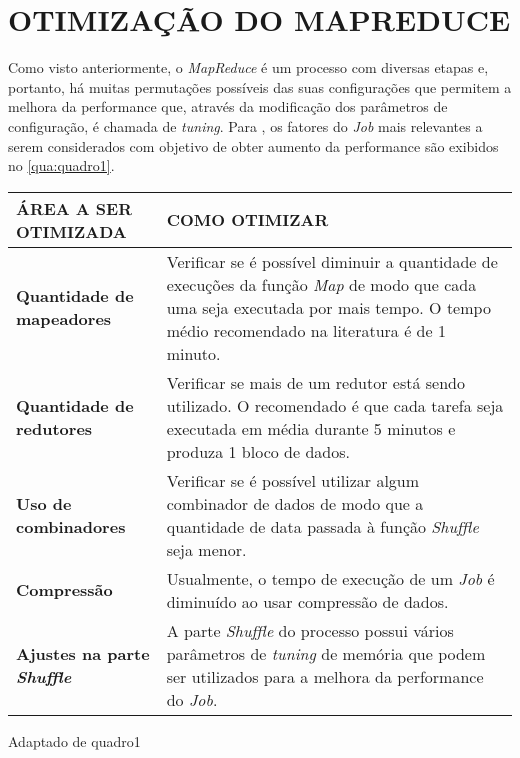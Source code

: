 \chapter{OTIMIZAÇÃO DO MAPREDUCE} \label{cha:otimizacaomapreduce}

Como visto anteriormente, o \textit{MapReduce} é um processo com diversas etapas e, portanto, há muitas permutações possíveis das suas configurações que permitem a melhora da performance que, através da modificação dos parâmetros de configuração, é chamada de \textit{tuning}. Para \textcite{HadoopBook15}, os fatores do \textit{Job} mais relevantes a serem considerados com objetivo de obter aumento da performance são exibidos no \autoref{qua:quadro1}.

{\footnotesize
  \centering
  \begin{tabular}{|p{50mm}|p{100mm}|}\hline
    \textbf{ÁREA A SER OTIMIZADA}              & \textbf{COMO OTIMIZAR}                                                                                                                                                                       \\\hline
    \textbf{Quantidade de mapeadores}          & Verificar se é possível diminuir a quantidade de execuções da função \textit{Map} de modo que cada uma seja executada por mais tempo. O tempo médio recomendado na literatura é de 1 minuto. \\\hline
    \textbf{Quantidade de redutores}           & Verificar se mais de um redutor está sendo utilizado. O recomendado é que cada tarefa seja executada em média durante 5 minutos e produza 1 bloco de dados.                                  \\\hline
    \textbf{Uso de combinadores}               & Verificar se é possível utilizar algum combinador de dados de modo que a quantidade de data passada à função \textit{Shuffle} seja menor.                                                    \\\hline
    \textbf{Compressão}                        & Usualmente, o tempo de execução de um \textit{Job} é diminuído ao usar compressão de dados.                                                                                                  \\\hline
    \textbf{Ajustes na parte \textit{Shuffle}} & A parte \textit{Shuffle} do processo possui vários parâmetros de \textit{\gls{tuning}} de memória que podem ser utilizados para a melhora da performance do \textit{Job}.                    \\\hline
  \end{tabular}}
{Adaptado de \cite{HadoopBook15}}{quadro1}{}{}


